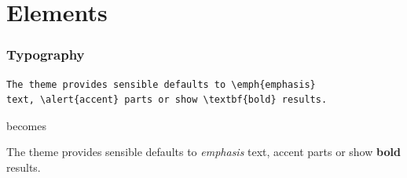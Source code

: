 \documentclass[10pt, compress]{beamer}
\begin{document}

\section{Elements}

\begin{frame}[fragile]
  \frametitle{Typography}
      \begin{verbatim}
The theme provides sensible defaults to \emph{emphasis}
text, \alert{accent} parts or show \textbf{bold} results.
      \end{verbatim}

  \begin{center}becomes\end{center}

  The theme provides sensible defaults to \emph{emphasis} text,
  \alert{accent} parts or show \textbf{bold} results.
\end{frame}




\end{document}
